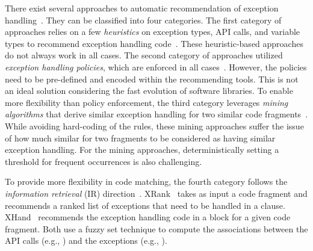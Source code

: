 There exist several approaches to automatic recommendation of 
exception
handling~\cite{barbosa-bsse12,chanchal-scam14,barbosa-tse18,barbosa-tse16,xrank-fse20,throw-ase22}. They
can be classified into four categories. The first category of
approaches relies on a few {\em heuristics} on exception types, API
calls, and variable types to recommend exception handling
code~\cite{barbosa-bsse12}. These heuristic-based approaches do not
always work in all cases. The second category of approaches
utilized {\em exception handling policies}, which are enforced in all
cases~\cite{barbosa-tse16,barbosa-saner18}. However, the policies need
to be pre-defined and encoded within the recommending tools.  This is not
an ideal solution considering the fast evolution of software
libraries. To enable more flexibility than policy enforcement, the
third category leverages {\em mining algorithms} that derive
similar exception handling for two similar code
fragments~\cite{chanchal-scam14}. While avoiding hard-coding of
the rules, these mining approaches suffer the issue of how much similar
for two fragments to be considered as having similar exception
handling. For the mining approaches, deterministically setting a
threshold for frequent occurrences is also challenging.

To provide more flexibility in code matching, the fourth category
follows the {\em information retrieval} (IR)
direction~\cite{xrank-fse20}. XRank~\cite{xrank-fse20} takes as input
a code fragment and recommends a ranked list of exceptions that need
to be handled in a  clause. XHand~\cite{xrank-fse20}
recommends the exception handling code in a  block for a
given code fragment. Both use a fuzzy set technique to compute the
associations between the API calls (e.g.,
) and the exceptions (e.g.,
).


